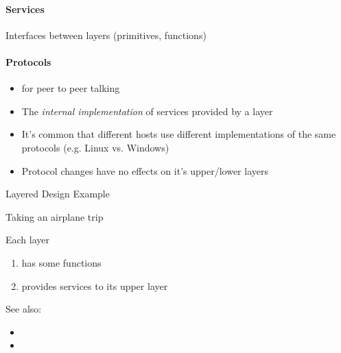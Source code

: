 \paragraph{Services}

Interfaces between layers (primitives, functions)

\paragraph{Protocols}

\begin{itemize}
\item for peer to peer talking
\item The \emph{internal implementation} of services provided by a layer
\item It's common that different hosts use different implementations of the same protocols
  (e.g. Linux vs. Windows)
\item Protocol changes have no effects on it's upper/lower layers
\end{itemize}

\begin{frame}{Layered Design Example}
  \begin{iblock}{Taking an airplane trip}
    \begin{center}
    \end{center}
    Each layer
    \begin{enumerate}
    \item has some functions
    \item provides services to its upper layer
    \end{enumerate}
  \end{iblock}
\end{frame}

See also:
\begin{itemize}
\item {}
\item {}
\end{itemize}

